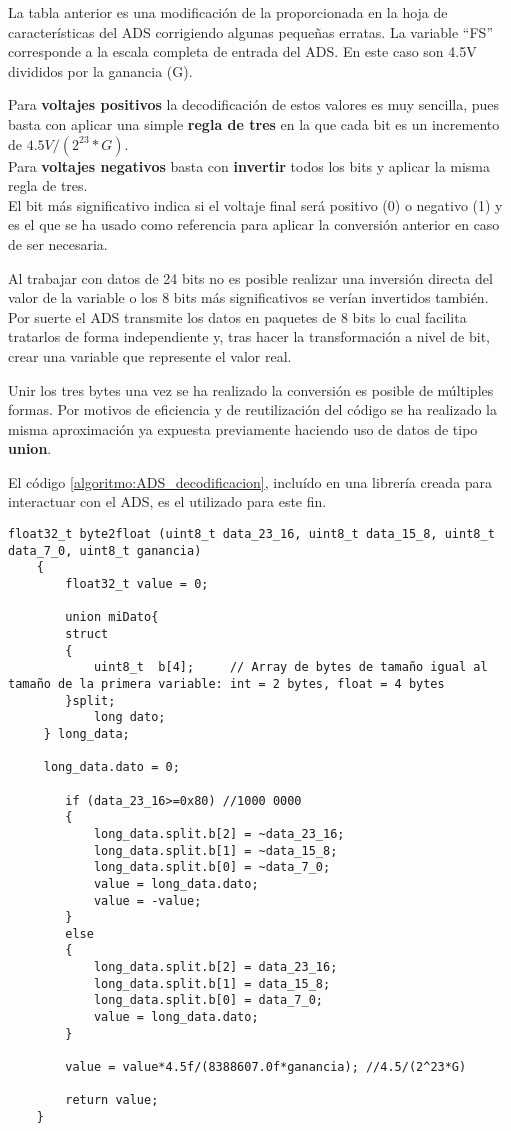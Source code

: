 La tabla anterior es una modificación de la proporcionada en la hoja de características del ADS corrigiendo algunas pequeñas erratas. La variable ``FS'' corresponde a la escala completa de entrada del ADS. En este caso son 4.5V divididos por la ganancia (G).

Para \textbf{voltajes positivos} la decodificación de estos valores es muy sencilla, pues basta con aplicar una simple \textbf{regla de tres} en la que cada bit es un incremento de $4.5V/(2^{23}*G)$.\\
Para \textbf{voltajes negativos} basta con \textbf{invertir} todos los bits y aplicar la misma regla de tres.\\
El bit más significativo indica si el voltaje final será positivo (0) o negativo (1) y es el que se ha usado como referencia para aplicar la conversión anterior en caso de ser necesaria.

Al trabajar con datos de 24 bits no es posible realizar una inversión directa del valor de la variable o los 8 bits más significativos se verían invertidos también. Por suerte el ADS transmite los datos en paquetes de 8 bits lo cual facilita tratarlos de forma independiente y, tras hacer la transformación a nivel de bit, crear una variable que represente el valor real.

Unir los tres bytes una vez se ha realizado la conversión es posible de múltiples formas. Por motivos de eficiencia y de reutilización del código se ha realizado la misma aproximación ya expuesta previamente haciendo uso de datos de tipo \textbf{union}.

El código \ref{algoritmo:ADS_decodificacion}, incluído en una librería creada para interactuar con el ADS, es el utilizado para este fin.

\clearpage

\begin{lstlisting}[label=algoritmo:ADS_decodificacion,style = STM-code,frame=single,caption=Decodificación de datos binarios a Voltajes]
float32_t byte2float (uint8_t data_23_16, uint8_t data_15_8, uint8_t data_7_0, uint8_t ganancia)
	{
		float32_t value = 0;
		
		union miDato{
		struct
		{
			uint8_t  b[4];     // Array de bytes de tamaño igual al tamaño de la primera variable: int = 2 bytes, float = 4 bytes
		}split;
			long dato;
	 } long_data; 
		
	 long_data.dato = 0;
	 
		if (data_23_16>=0x80) //1000 0000
		{
			long_data.split.b[2] = ~data_23_16;
			long_data.split.b[1] = ~data_15_8;
			long_data.split.b[0] = ~data_7_0;
			value = long_data.dato;
			value = -value;
		}
		else
		{
			long_data.split.b[2] = data_23_16;
			long_data.split.b[1] = data_15_8;
			long_data.split.b[0] = data_7_0;
			value = long_data.dato;
		}
		
		value = value*4.5f/(8388607.0f*ganancia); //4.5/(2^23*G)
		
		return value;
	}
\end{lstlisting}

